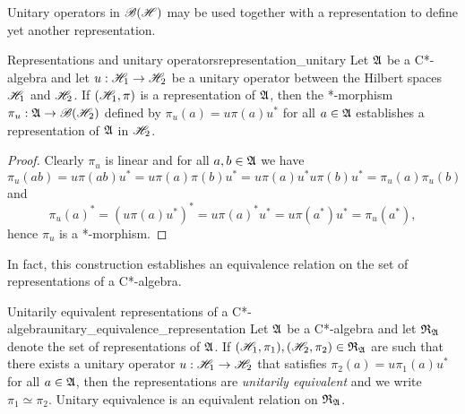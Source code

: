 Unitary operators in \(\mathscr{B}(\mathscr{H})\) may be used together with a representation to define yet another representation.
\begin{proposition}{Representations and unitary operators}{representation_unitary}
    Let \(\mathfrak{A}\) be a C*-algebra and let \(u : \mathscr{H}_1 \to \mathscr{H}_2\) be a unitary operator between the Hilbert spaces \(\mathscr{H}_1\) and \(\mathscr{H}_2\). If \((\mathscr{H}_1, \pi)\) is a representation of \(\mathfrak{A}\), then the *-morphism \(\pi_u : \mathfrak{A} \to \mathscr{B}(\mathscr{H}_2)\) defined by \(\pi_u(a) = u\pi(a)u^*\) for all \(a \in \mathfrak{A}\) establishes a representation of \(\mathfrak{A}\) in \(\mathscr{H}_2\).
\end{proposition}
\begin{proof}
    Clearly \(\pi_u\) is linear and for all \(a, b \in \mathfrak{A}\) we have
    \begin{equation*}
        \pi_u(ab) = u \pi(ab) u^* = u \pi(a) \pi(b) u^* = u \pi(a) u^* u \pi(b) u^* = \pi_u(a)\pi_u(b)
    \end{equation*}
    and 
    \begin{equation*}
        \pi_u(a)^* = (u \pi(a) u^*)^* = u \pi(a)^* u^* = u \pi(a^*)u^* = \pi_u(a^*),
    \end{equation*}
    hence \(\pi_u\) is a *-morphism.
\end{proof}
In fact, this construction establishes an equivalence relation on the set of representations of a C*-algebra.
\begin{proposition}{Unitarily equivalent representations of a C*-algebra}{unitary_equivalence_representation}
    Let \(\mathfrak{A}\) be a C*-algebra and let \(\mathfrak{R}_{\mathfrak{A}}\) denote the set of representations of \(\mathfrak{A}\). If \((\mathscr{H}_1, \pi_1), (\mathscr{H}_2, \pi_2) \in \mathfrak{R}_{\mathfrak{A}}\) are such that there exists a unitary operator \(u : \mathscr{H}_1 \to \mathscr{H}_2\) that satisfies \(\pi_2(a) = u\pi_1(a) u^*\) for all \(a \in \mathfrak{A}\), then the representations are \emph{unitarily equivalent} and we write \(\pi_1 \simeq \pi_2\). Unitary equivalence is an equivalent relation on \(\mathfrak{R}_{\mathfrak{A}}\).
\end{proposition}
